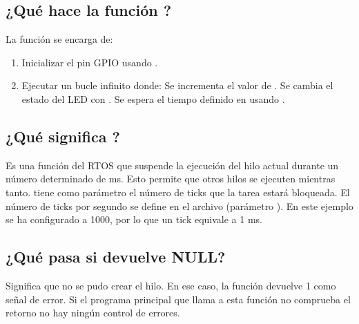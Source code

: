 \documentclass[letterpaper,10pt,english]{sphinxmanual}
\begin{document}
\subsection{¿Qué hace la función ?}
\label{\detokenize{ejemplothread:que-hace-la-funcion-thread}}
\sphinxAtStartPar
La función  se encarga de:
\begin{enumerate}
%
\item {} 
\sphinxAtStartPar
Inicializar el pin GPIO usando .

\item {} 
\sphinxAtStartPar
Ejecutar un bucle infinito donde:
\sphinxhyphen{} Se incrementa el valor de  .
\sphinxhyphen{} Se cambia el estado del LED con .
\sphinxhyphen{} Se espera el tiempo definido en  usando .

\end{enumerate}


\subsection{¿Qué significa ?}
\label{\detokenize{ejemplothread:que-significa-osdelay}}
\sphinxAtStartPar
Es una función del RTOS que suspende la ejecución del hilo actual durante un número determinado de ms.
Esto permite que otros hilos se ejecuten mientras tanto.  tiene como parámetro el número de ticks que la tarea estará bloqueada.
El número de ticks por segundo se define en el archivo  (parámetro ). En este ejemplo se ha configurado a 1000, por lo que un tick equivale a 1 ms.


\subsection{¿Qué pasa si  devuelve NULL?}
\label{\detokenize{ejemplothread:que-pasa-si-osthreadnew-devuelve-null}}
\sphinxAtStartPar
Significa que no se pudo crear el hilo. En ese caso, la función  devuelve \sphinxhyphen{}1 como señal de error. Si el programa principal que llama a esta función no comprueba el retorno no hay ningún control de errores.
\end{document}

